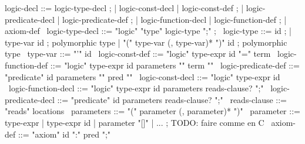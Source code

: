 \begin{syntax}
  logic-decl ::= logic-type-decl ;
          | logic-const-decl | logic-const-def ;
          | logic-predicate-decl | logic-predicate-def ;
          | logic-function-decl | logic-function-def ;
          | axiom-def
  \
  logic-type-decl ::= "logic" "type" logic-type ";" ; 
  \
  logic-type ::= id ;
  | type-var id ; polymorphic type
  | "(" type-var (, type-var)* ")" id ; polymorphic type
  \
  type-var ::= "'" id 
  \
  logic-const-def ::= "logic" type-expr id "=" term
  \
  logic-function-def ::= "logic" type-expr id parameters "{" term "}"
  \
  logic-predicate-def ::= "predicate" id parameters "{" pred "}"
  \
  logic-const-decl ::= "logic" type-expr id 
  \
  logic-function-decl ::= "logic" type-expr id parameters reads-clause? ";"
  \
  logic-predicate-decl ::= "predicate" id parameters reads-clause? ";"
  \
  reads-clause ::= "reads" locations
  \
  parameters ::= "(" parameter (, parameter)* ")"
  \
  parameter ::= type-expr | type-expr id | parameter "[]" | ... ; TODO: faire comme en C
  \
  axiom-def ::= "axiom" id ":" pred ";"
\end{syntax}